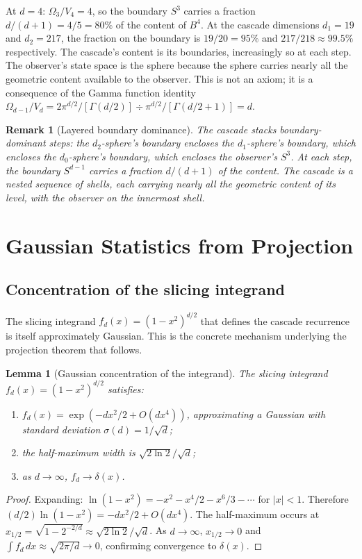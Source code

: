 \documentclass[12pt,a4paper]{article}
\newtheorem{lemma}[theorem]{Lemma}
\newtheorem{remark}[theorem]{Remark}
\begin{document}
At $d=4$: $\Omega_3/V_4=4$, so the boundary $S^3$ carries a fraction $d/(d+1)=4/5=80\%$
of the content of $B^4$. At the cascade dimensions $d_1=19$ and $d_2=217$, the fraction
on the boundary is $19/20=95\%$ and $217/218\approx 99.5\%$ respectively. The cascade's
content is its boundaries, increasingly so at each step. The observer's state space is the
sphere because the sphere carries nearly all the geometric content available to the observer.
This is not an axiom; it is a consequence of the Gamma function identity
$\Omega_{d-1}/V_d = 2\pi^{d/2}/[\Gamma(d/2)] \div \pi^{d/2}/[\Gamma(d/2+1)] = d$.

\begin{remark}[Layered boundary dominance]
The cascade stacks boundary-dominant steps: the $d_2$-sphere's boundary encloses the
$d_1$-sphere's boundary, which encloses the $d_0$-sphere's boundary, which encloses the
observer's $S^3$. At each step, the boundary $S^{d-1}$ carries a fraction $d/(d+1)$ of the
content. The cascade is a nested sequence of shells, each carrying nearly all the geometric
content of its level, with the observer on the innermost shell.
\end{remark}

\section{Gaussian Statistics from Projection}\label{sec:gaussian-statistics-from-projection}

\subsection{Concentration of the slicing integrand}

The slicing integrand $f_d(x) = (1-x^2)^{d/2}$ that defines the cascade recurrence
is itself approximately Gaussian. This is the concrete mechanism underlying the
projection theorem that follows.

\begin{lemma}[Gaussian concentration of the integrand]\label{lem:gaussian}
The slicing integrand $f_d(x) = (1-x^2)^{d/2}$ satisfies:
\begin{enumerate}
\item[(a)] $f_d(x) = \exp(-dx^2/2 + O(dx^4))$, approximating a Gaussian with standard
deviation $\sigma(d) = 1/\sqrt{d}$;
\item[(b)] the half-maximum width is $\sqrt{2\ln 2}/\sqrt{d}$;
\item[(c)] as $d\to\infty$, $f_d\to\delta(x)$.
\end{enumerate}
\end{lemma}
\begin{proof}
Expanding: $\ln(1-x^2) = -x^2 - x^4/2 - x^6/3 - \cdots$ for $|x|<1$. Therefore
$(d/2)\ln(1-x^2) = -dx^2/2 + O(dx^4)$. The half-maximum occurs at
$x_{1/2} = \sqrt{1-2^{-2/d}} \approx \sqrt{2\ln 2}/\sqrt{d}$.
As $d\to\infty$, $x_{1/2}\to 0$ and $\int f_d\,dx \approx \sqrt{2\pi/d}\to 0$,
confirming convergence to $\delta(x)$.
\end{proof}
\end{document}
